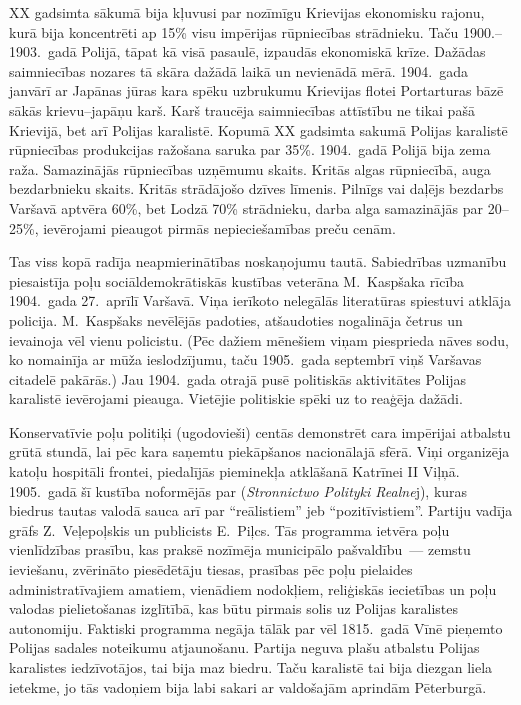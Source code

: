 \documentclass[twoside,a5paper,12pt,fleqn,openany]{extbook}
\newcommand{\pltxti}[1]{\textit{\textpolish{#1}}}
\begin{document}
XX gadsimta sākumā  bija kļuvusi par nozīmīgu Krievijas ekonomisku rajonu, kurā bija koncentrēti ap 15\% visu impērijas rūpniecības strādnieku. Taču 1900.--1903.~gadā Polijā, tāpat kā visā pasaulē, izpaudās ekonomiskā krīze. Dažādas saimniecības nozares tā skāra dažādā laikā un nevienādā mērā. 1904.~gada janvārī ar Japānas jūras kara spēku uzbrukumu Krievijas flotei Portarturas bāzē sākās krievu--japāņu karš. Karš traucēja saimniecības attīstību ne tikai pašā Krievijā, bet arī Polijas karalistē. Kopumā XX gadsimta sakumā Polijas karalistē rūpniecības produkcijas ražošana saruka par 35\%. 1904.~gadā Polijā bija zema raža. Samazinājās rūpniecības uzņēmumu skaits. Kritās algas rūpniecībā, auga bezdarbnieku skaits. Kritās strādājošo dzīves līmenis. Pilnīgs vai daļējs bezdarbs Varšavā aptvēra 60\%, bet Lodzā 70\% strādnieku, darba alga samazinājās par 20--25\%, ievērojami pieaugot pirmās nepieciešamības preču cenām.

Tas viss kopā radīja neapmierinātības noskaņojumu tautā. Sabiedrības uzmanību piesaistīja poļu sociāldemokrātiskās kustības veterāna M.~Kaspšaka rīcība 1904.~gada 27.~aprīlī Varšavā. Viņa ierīkoto nelegālās literatūras spiestuvi atklāja policija. M.~Kaspšaks nevēlējās padoties, atšaudoties nogalināja četrus un ievainoja vēl vienu policistu. (Pēc dažiem mēnešiem viņam piesprieda nāves sodu, ko nomainīja ar mūža ieslodzījumu, taču 1905.~gada septembrī viņš Varšavas citadelē pakārās.) Jau 1904.~gada otrajā pusē politiskās aktivitātes Polijas karalistē ievērojami pieauga. Vietējie politiskie spēki uz to reaģēja dažādi.

Konservatīvie poļu politiķi (ugodovieši) centās demonstrēt cara impērijai atbalstu grūtā stundā, lai pēc kara saņemtu piekāpšanos nacionālajā sfērā. Viņi organizēja katoļu hospitāli frontei, piedalījās pieminekļa atklāšanā Katrīnei II Viļņā. 1905.~gadā šī kustība noformējās par  (\pltxti{Stronnictwo Polityki Realne}j), kuras biedrus tautas valodā sauca arī par ``reālistiem'' jeb ``pozitīvistiem''. Partiju vadīja grāfs Z.~Veļepoļskis un publicists E.~Piļcs. Tās programma ietvēra poļu vienlīdzības prasību, kas praksē nozīmēja municipālo pašvaldību~--- zemstu ieviešanu, zvērināto piesēdētāju tiesas, prasības pēc poļu pielaides administratīvajiem amatiem, vienādiem nodokļiem, reliģiskās iecietības un poļu valodas pielietošanas izglītībā, kas būtu pirmais solis uz Polijas karalistes autonomiju. Faktiski programma negāja tālāk par vēl 1815.~gadā Vīnē pieņemto Polijas sadales noteikumu atjaunošanu. Partija neguva plašu atbalstu Polijas karalistes iedzīvotājos, tai bija maz biedru. Taču karalistē tai bija diezgan liela ietekme, jo tās vadoņiem bija labi sakari ar valdošajām aprindām Pēterburgā.
\end{document}
